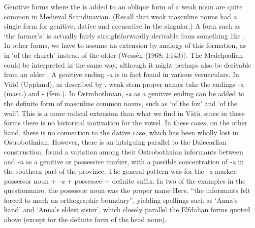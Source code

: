 Genitive forms where the is added to an oblique form of a weak noun are quite common in Medieval Scandinavian. (Recall that weak masculine nouns had a single form for genitive, dative and accusative in the singular.) A form such as  ‘the farmer’s’ is actually fairly straightforwardly derivable from something like . In other forms, we have to assume an extension by analogy of this formation, as in  ‘of the church’ instead of the older  (Wessén (1968: I:143)). The Medelpadian  could be interpreted in the same way, although it might perhaps also be derivable from an older . A genitive ending\textit{ {}-a} is in fact found in various vernaculars. In Vätö (Uppland), as described by \citet{Schagerström1882}, weak stem proper names take the endings\textit{ {}-a} (masc.) and \nobreakdash- (fem.). In Ostrobothnian,\textit{ {}-a} as a genitive ending can be added to the definite form of masculine common nouns, such as  ‘of the fox’ and  ‘of the wolf’. This is a more radical extension than what we find in Vätö, since in these forms there is no historical motivation for the  vowel. In these cases, on the other hand, there is no connection to the dative case, which has been wholly lost in Ostrobothnian. However, there is an intriguing parallel to the Dalecarlian construction. \citet[43]{ErikssonEtAl1999} found a variation among their Ostrobothnian informants between and\textit{ {}-a} as a genitive or possessive marker, with a possible concentration of\textit{ {}-a} in the southern part of the province. The general pattern was for the\textit{ {}-a} marker: possessor noun +\textit{ {}-a} + possessee + definite suffix. In two of the examples in the questionnaire, the possessor noun was the proper name Here, “the informants felt forced to mark an orthographic boundary”, yielding spellings such as  ‘Anna’s hand’ and ‘Anna’s eldest sister’, which closely parallel the Elfdalian forms quoted above (except for the definite form of the head noun).

